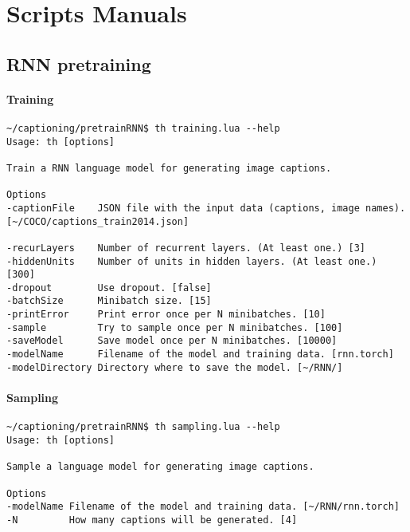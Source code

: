 \chapter{Scripts Manuals} \label{chp:manuals}

\section{RNN pretraining}

\subsubsection{Training}

\begin{lstlisting}[firstnumber=1,breakindent=75pt]
~/captioning/pretrainRNN$ th training.lua --help  
Usage: th [options] 

Train a RNN language model for generating image captions.

Options
-captionFile    JSON file with the input data (captions, image names). [~/COCO/captions_train2014.json]

-recurLayers    Number of recurrent layers. (At least one.) [3]
-hiddenUnits    Number of units in hidden layers. (At least one.) [300]
-dropout        Use dropout. [false]
-batchSize      Minibatch size. [15]
-printError     Print error once per N minibatches. [10]
-sample         Try to sample once per N minibatches. [100]
-saveModel      Save model once per N minibatches. [10000]
-modelName      Filename of the model and training data. [rnn.torch]
-modelDirectory Directory where to save the model. [~/RNN/]
\end{lstlisting}
\hspace{1cm}

\subsubsection{Sampling}

\begin{lstlisting}[firstnumber=1,breakindent=75pt]
~/captioning/pretrainRNN$ th sampling.lua --help
Usage: th [options] 

Sample a language model for generating image captions.

Options
-modelName Filename of the model and training data. [~/RNN/rnn.torch]
-N         How many captions will be generated. [4]
\end{lstlisting}
\hspace{1cm}

